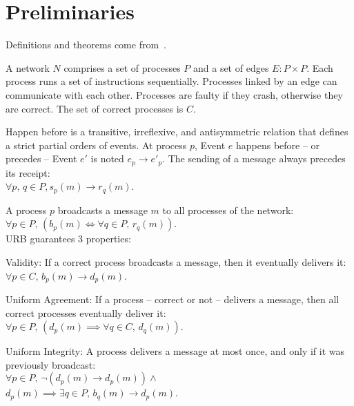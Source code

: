 
\section{Preliminaries}
\label{sec:preliminaries}

Definitions and theorems come from~\cite{hadzilacos1994modular}.

\begin{definition}[Network]
  A network $N$ comprises a set of processes $P$ and a set of edges
  $E: P \times P$. Each process runs a set of instructions
  sequentially. Processes linked by an edge can communicate with each
  other. Processes are faulty if they crash, otherwise they are correct. The set
  of correct processes is $C$.
\end{definition}



\begin{definition}
  Happen before is a transitive, irreflexive, and antisymmetric relation that
  defines a strict partial orders of events. At process $p$, Event $e$ happens
  before -- or precedes -- Event $e'$ is noted $e_p \rightarrow e'_p$. The
  sending of a message always precedes its receipt: \\
  $\forall p,\,q \in P, s_p(m) \rightarrow r_q(m)$.
\end{definition}

\begin{definition}
  A process $p$ broadcasts a message $m$ to all processes of the network: \\
  $\forall p \in P,\, (b_p(m) \Leftrightarrow \forall q \in P,\, r_q(m))$. \\ URB guarantees 3 properties: 

  \begin{asparadesc}
  \item [Validity:] If a correct process broadcasts a message, then it eventually
    delivers it: $\forall p \in C,\, b_p(m) \rightarrow d_p(m)$.
  \item [Uniform Agreement:] If a process -- correct or not -- delivers a message,
    then all correct processes eventually deliver it:\\
    $\forall p \in P,\, (d_p(m) \implies \forall q \in C,\, d_q(m))$.
  \item [Uniform Integrity:] A process delivers a message at most once, and
    only if it was previously broadcast:\\
    $\forall p \in P,\, \neg(d_p(m) \rightarrow d_p(m)) \wedge$\\$d_p(m)
    \implies \exists q \in P,\, b_q(m) \rightarrow d_p(m)$.
\end{asparadesc}

\end{definition}


